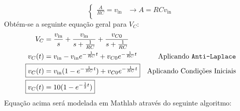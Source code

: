 \documentclass{article}
\begin{document}
\begin{resolution}
\begin{equation*}
\begin{cases}
                            \frac{A}{RC} = v_{\text{in}} & \rightarrow \boxed{A = RCv_{\text{in}}}\\
                        \end{cases}
                    \end{equation*}
                Obtém-se a seguinte equação geral para $V_{C}$:
                    \begin{align}
                        V_{C}       &= \frac{v_{\text{in}}}{s} + \frac{v_{\text{in}}}{s + \frac{1}{RC}} + \frac{v_{C0}}{s + \frac{1}{RC}}\nonumber\\
                        v_{C}(t)    &= v_{\text{in}} - v_{\text{in}}e^{-\frac{1}{RC}t} + v_{C0}e^{-\frac{1}{RC}t} & \text{Aplicando \texttt{Anti-Laplace}}\nonumber\\
                        \Aboxed{
                            v_{C}(t)    &= v_{\text{in}}(1 - e^{-\frac{1}{RC}t}) + v_{C0}e^{-\frac{1}{RC}t}
                        } & \text{Aplicando Condições Iniciais}\\
                        \Aboxed{
                            v_{C}(t)    &= 10(1 - e^{-\frac{1}{2}t})
                        }
                    \end{align}
                Equação acima será modelada em Mathlab através do seguinte algoritmo:
                    \begin{scriptsize}
                        \myOctave
                        
                    \end{scriptsize}
            \end{resolution}
\end{document}
